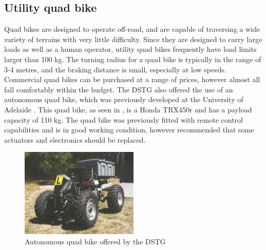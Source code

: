 \documentclass[main.tex]{subfiles}
\begin{document}
\begin{appendices}
\section{Utility quad bike}
Quad bikes are designed to operate off-road, and are capable of traversing a wide variety of terrains with very little difficulty. Since they are designed to carry large loads as well as a human operator, utility quad bikes frequently have load limits larger than 100 kg. The turning radius for a quad bike is typically in the range of 3-4 metres, and the braking distance is small, especially at low speeds. Commercial quad bikes can be purchased at a range of prices, however almost all fall comfortably within the budget. The DSTG also offered the use of an autonomous quad bike, which was previously developed at the University of Adelaide \parencite{scheiner2011}. This quad bike, as seen in , is a Honda TRX450r and has a payload capacity of 110 kg. The quad bike was previously fitted with remote control capabilities and is in good working condition, however \textcite{scheiner2011} recommended that some actuators and electronics should be replaced.
\begin{figure}[ht]
\includegraphics[width=0.5\textwidth]{8-Appendices/2011quadbike.PNG}
\centering
\caption[Autonomous quad bike offered by the DSTG]{Autonomous quad bike offered by the DSTG \parencite{scheiner2011}} 
\end{figure}


\end{appendices}
\end{document}
